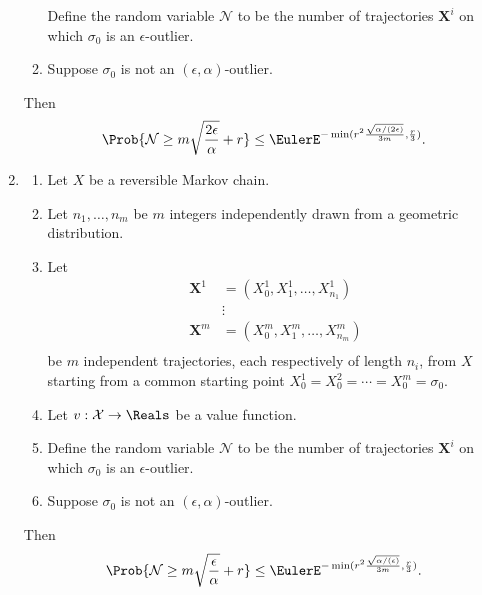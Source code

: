\documentclass[12pt]{article}
\begin{document}
\begin{enumerate}
\begin{theorem}
\begin{enumerate}
            Define the random variable \( \mathcal{N} \) to be the
            number of trajectories \( \mathbf{X}^i \) on which \( \sigma_0
            \) is an \( \epsilon \)-outlier.
        \item
            Suppose \( \sigma_0 \) is not an \( (\epsilon, \alpha) \)-outlier.
    \end{enumerate}
    Then
    \[
        \Prob{\mathcal{N} \ge m \sqrt{\frac{2\epsilon}{\alpha}} + r} \le
        \EulerE^{-\min(r^2 \frac{\sqrt{\alpha/(2\epsilon)}}{3m}, \frac{r}
        {3})}.
    \]
\end{theorem}
\item \begin{theorem}
    \label{thm:parallelsignificance:thm6point1}
    \begin{enumerate}
        \item
            Let \( X \) be a reversible Markov chain.
          \item
            Let \(n_1, \dots, n_m \) be \( m \) integers independently
            drawn from a geometric distribution.
        \item
            Let
            \begin{align*}
                \mathbf{X}^1 &= (X_0^1, X_1^1, \dots, X_{n_1}^1 )\\
                &\vdots \\
                \mathbf{X}^m &= (X_0^m, X_1^m, \dots, X_{n_m}^m )\\
            \end{align*}
            be \( m \) independent trajectories, each respectively  of length \( n_{i} \), from \(
            X \) starting from a common starting point \( X_0^1 =
            X_0^2 = \cdots = X_0^m = \sigma_0 \). 
        \item
            Let \( v :  \mathcal{X} \to \Reals \) be a value function.
        \item
            Define the random variable \( \mathcal{N} \) to be the
            number of trajectories \( \mathbf{X}^i \) on which \( \sigma_0
            \) is an \( \epsilon \)-outlier.
        \item
            Suppose \( \sigma_0 \) is not an \( (\epsilon, \alpha) \)-outlier.
    \end{enumerate}
    Then
    \[
        \Prob{\mathcal{N} \ge m \sqrt{\frac{\epsilon}{\alpha}} + r} \le
        \EulerE^{-\min(r^2 \frac{\sqrt{\alpha/(\epsilon)}}{3m}, \frac{r}
        {3})}.
    \]
\end{theorem}
\end{enumerate}
\end{document}
